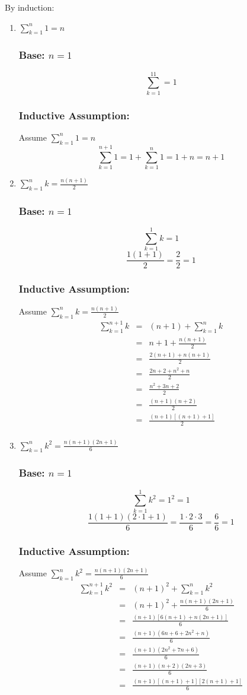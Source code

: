 \documentclass[letterpaper,12pt,fleqn]{article}
\begin{document}
\begin{theproof}
By induction:
\begin{enumerate}
\item $\sum_{k=1}^n1=n$
\subsubsection*{Base: $n=1$}
\[\sum_{k=1}^11=1\]
\subsubsection*{Inductive Assumption:}
Assume $\sum_{k=1}^n1=n$
\[\sum_{k=1}^{n+1}1=1+\sum_{k=1}^n1=1+n=n+1\]

\item $\sum_{k=1}^nk=\frac{n(n+1)}{2}$
\subsubsection*{Base: $n=1$}
\[\sum_{k=1}^1k=1\]
\[\frac{1(1+1)}{2}=\frac{2}{2}=1\]
\subsubsection*{Inductive Assumption:}
Assume $\sum_{k=1}^nk=\frac{n(n+1)}{2}$
\begin{eqnarray*}
\sum_{k=1}^{n+1}k &=& (n+1)+\sum_{k=1}^nk \\
    &=& n+1+\frac{n(n+1)}{2} \\
    &=& \frac{2(n+1)+n(n+1)}{2} \\
    &=& \frac{2n+2+n^2+n}{2} \\
    &=& \frac{n^2+3n+2}{2} \\
    &=& \frac{(n+1)(n+2)}{2} \\
    &=& \frac{(n+1)[(n+1)+1]}{2} \\
\end{eqnarray*}

\item $\sum_{k=1}^nk^2=\frac{n(n+1)(2n+1)}{6}$
\subsubsection*{Base: $n=1$}
\[\sum_{k=1}^1k^2=1^2=1\]
\[\frac{1(1+1)(2\cdot1+1)}{6}=\frac{1\cdot2\cdot3}{6}=\frac{6}{6}=1\]
\subsubsection*{Inductive Assumption:}
Assume $\sum_{k=1}^nk^2=\frac{n(n+1)(2n+1)}{6}$
\begin{eqnarray*}
\sum_{k=1}^{n+1}k^2 &=& (n+1)^2+\sum_{k=1}^nk^2 \\
    &=& (n+1)^2+\frac{n(n+1)(2n+1)}{6} \\
    &=& \frac{(n+1)[6(n+1)+n(2n+1)]}{6} \\
    &=& \frac{(n+1)(6n+6+2n^2+n)}{6} \\
    &=& \frac{(n+1)(2n^2+7n+6)}{6} \\
    &=& \frac{(n+1)(n+2)(2n+3)}{6} \\
    &=& \frac{(n+1)[(n+1)+1][2(n+1)+1]}{6} \\
\end{eqnarray*}


\end{enumerate}
\end{theproof}
\end{document}
